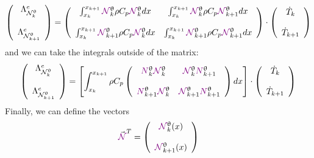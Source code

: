 \[
\left(
\begin{array}{c}
{\Lambda}_{{\mathcal{N}}_k^\uptheta}^e  \\ \\ 
{\Lambda}_{{\mathcal{N}}_{k+1}^\uptheta}^e
\end{array}
\right)
=
\left(
\begin{array}{cc}
\int_{x_k}^{x_{k+1}} {\color{violet}{\mathcal{N}}}_k^\uptheta        \rho C_p {\color{violet}{\mathcal{N}}}_{k}^\uptheta dx  
&  \int_{x_k}^{x_{k+1}} {\color{violet}{\mathcal{N}}}_k^\uptheta     \rho C_p {\color{violet}{\mathcal{N}}}_{k+1}^\uptheta dx\\ \\
\int_{x_k}^{x_{k+1}} {\color{violet}{\mathcal{N}}}_{k+1}^\uptheta    \rho C_p {\color{violet}{\mathcal{N}}}_{k}^\uptheta dx  
&  \int_{x_k}^{x_{k+1}} {\color{violet}{\mathcal{N}}}_{k+1}^\uptheta \rho C_p {\color{violet}{\mathcal{N}}}_{k+1}^\uptheta dx 
\end{array}
\right)
\cdot
\left(
\begin{array}{c}
\dot{T}_k \\ \\
\dot{T}_{k+1}
\end{array}
\right)
\]
and we can take the integrals outside of the matrix:
\[
\left(
\begin{array}{c}
{\Lambda}_{{\mathcal{N}}_k^\uptheta}^e \\ \\ {\Lambda}_{{\mathcal{N}}_{k+1}^\uptheta}^e
\end{array}
\right)
=
\left[
\int_{x_k}^{x_{k+1}}
\rho C_p
\left(
\begin{array}{cc}
{\color{violet}N}_k^\uptheta     {\color{violet}{\mathcal{N}}}_{k}^\uptheta 
&  {\color{violet}{\mathcal{N}}}_k^\uptheta     {\color{violet}N}_{k+1}^\uptheta  \\ \\
{\color{violet}N}_{k+1}^\uptheta {\color{violet}{\mathcal{N}}}_{k}^\uptheta 
&  {\color{violet}{\mathcal{N}}}_{k+1}^\uptheta {\color{violet}N}_{k+1}^\uptheta 
\end{array}
\right)
dx
\right]
\cdot
\left(
\begin{array}{c}
\dot{T}_k \\ \\ 
\dot{T}_{k+1}
\end{array}
\right)
\]
Finally, we can define the vectors 
\[
{\vec {\color{violet}{\mathcal{N}}}}^T = 
\left(
\begin{array}{c}
{\color{violet}{\mathcal{N}}}_k^\uptheta(x)  \\ \\  {\color{violet}{\mathcal{N}}}_{k+1}^\uptheta (x)
\end{array}
\right)
\]
